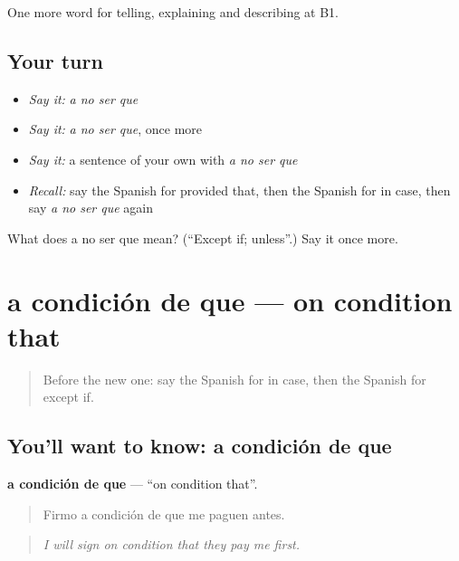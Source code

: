 \begin{grammarlens}[title={What you've built}]
One more word for telling, explaining and describing at B1.
\end{grammarlens}

\subsection*{Your turn}
\begin{itemize}
\raggedright
  \item \emph{Say it:} \emph{a no ser que}
  \item \emph{Say it:} \emph{a no ser que}, once more
  \item \emph{Say it:} a sentence of your own with \emph{a no ser que}
  \item \emph{Recall:} say the Spanish for provided that, then the Spanish for in case, then say \emph{a no ser que} again
\end{itemize}

\begin{tcolorbox}[breakable,colback=teal!4,colframe=teal!35!black,title={Before you move on}]
What does a no ser que mean? (\textquotedblleft{}Except if; unless\textquotedblright{}.) Say it once more.
\end{tcolorbox}
\section[a condición de que]{a condición de que — on condition that}

\label{lesson:ES-C612-a-condicion-de-que}



\begin{quote}
Before the new one: say the Spanish for in case, then the Spanish for except if.
\end{quote}

\subsection*{You'll want to know: a condición de que}
\textbf{a condición de que} — \textquotedblleft{}on condition that\textquotedblright{}.

\begin{quote}
Firmo a condición de que me paguen antes.
\end{quote}

\begin{quote}
\emph{I will sign on condition that they pay me first.}
\end{quote}

